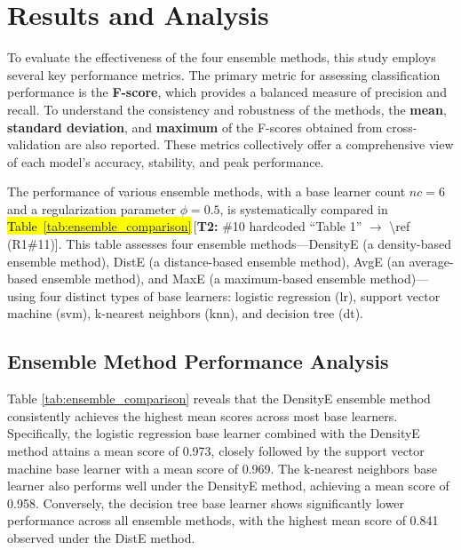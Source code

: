 \documentclass[lettersize,journal]{IEEEtran}
\newcommand{\tchange}[2]{\hl{#1}\,\textcolor{tier2note}{\footnotesize[\textbf{T2:} #2]}}
\begin{document}
	\section{Results and Analysis}
	
	\noindent To evaluate the effectiveness of the four ensemble methods, this study employs several key performance metrics. The primary metric for assessing classification performance is the \textbf{F-score}, which provides a balanced measure of precision and recall. To understand the consistency and robustness of the methods, the \textbf{mean}, \textbf{standard deviation}, and \textbf{maximum} of the F-scores obtained from cross-validation are also reported. These metrics collectively offer a comprehensive view of each model's accuracy, stability, and peak performance.
	
	\noindent The performance of various ensemble methods, with a base learner count $nc = 6$ and a regularization parameter $\phi = 0.5$, is systematically compared in \tchange{\mbox{Table \ref{tab:ensemble_comparison}}}{\#10 hardcoded ``Table 1'' $\rightarrow$ \textbackslash ref (R1\#11)}. This table assesses four ensemble methods—DensityE (a density-based ensemble method), DistE (a distance-based ensemble method), AvgE (an average-based ensemble method), and MaxE (a maximum-based ensemble method)—using four distinct types of base learners: logistic regression (lr), support vector machine (svm), k-nearest neighbors (knn), and decision tree (dt).
	
	\subsection{Ensemble Method Performance Analysis}
	
	\noindent Table \ref{tab:ensemble_comparison} reveals that the DensityE ensemble method consistently achieves the highest mean scores across most base learners. Specifically, the logistic regression base learner combined with the DensityE method attains a mean score of 0.973, closely followed by the support vector machine base learner with a mean score of 0.969. The k-nearest neighbors base learner also performs well under the DensityE method, achieving a mean score of 0.958.
	Conversely, the decision tree base learner shows significantly lower performance across all ensemble methods, with the highest mean score of 0.841
	observed under the DistE method.
	
	\setlength{\tabcolsep}{2pt} %
	
\end{document}
